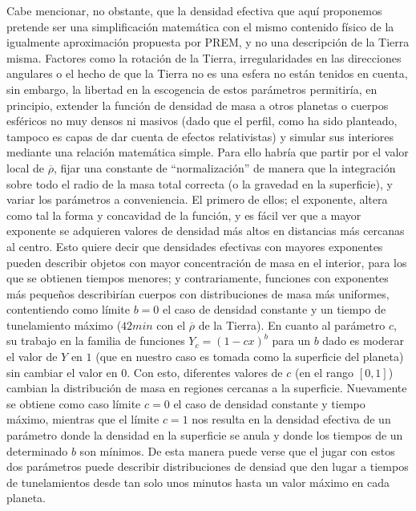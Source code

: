 \documentclass[aps,twocolumn,showpacs,preprintnumbers]{revtex4}
\begin{document}
    Cabe mencionar, no obstante, que la densidad efectiva que aquí proponemos pretende ser una simplificación matemática con el mismo contenido físico de la igualmente aproximación propuesta por PREM, y no una descripción de la Tierra misma. Factores como la rotación de la Tierra, irregularidades en las direcciones angulares o el hecho de que la Tierra no es una esfera no están tenidos en cuenta, sin embargo, la libertad en la escogencia de estos parámetros permitiría, en principio, extender la función de densidad de masa a otros planetas o cuerpos esféricos no muy densos ni masivos (dado que el perfil, como ha sido planteado, tampoco es capas de dar cuenta de efectos relativistas) y simular sus interiores mediante una relación matemática simple. Para ello habría que partir por el valor local de $\overline{\rho}$, fijar una constante de ``normalización'' de manera que la integración sobre todo el radio de la masa total correcta (o la gravedad en la superficie), y variar los parámetros a conveniencia. El primero de ellos; el exponente, altera como tal la forma y concavidad de la función, y es fácil ver que a mayor exponente se adquieren valores de densidad más altos en distancias más cercanas al centro. Esto quiere decir que densidades efectivas con mayores exponentes pueden describir objetos con mayor concentración de masa en el interior, para los que se obtienen tiempos menores; y contrariamente, funciones con exponentes más pequeños describirían cuerpos con distribuciones de masa más uniformes, contentiendo como límite $b=0$ el caso de densidad constante y un tiempo de tunelamiento máximo ($42 min$ con el $\overline{\rho}$ de la Tierra). En cuanto al parámetro $c$, su trabajo en la familia de funciones $Y_c =(1-c x)^b$ para un $b$ dado es moderar el valor de $Y$ en $1$ (que en nuestro caso es tomada como la superficie del planeta) sin cambiar el valor en $0$. Con esto, diferentes valores de $c$ (en el rango $[0,1]$) cambian la distribución de masa en regiones cercanas a la superficie. Nuevamente se obtiene como caso límite $c=0$ el caso de densidad constante y tiempo máximo, mientras que el límite $c=1$ nos resulta en la densidad efectiva de un parámetro donde la densidad en la superficie se anula y donde los tiempos de un determinado $b$ son mínimos. De esta manera puede verse que el jugar con estos dos parámetros puede describir distribuciones de densiad que den lugar a tiempos de tunelamientos desde tan solo unos minutos hasta un valor máximo en cada planeta.
    
\end{document}
